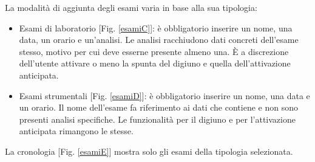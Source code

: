 \documentclass[12pt,a4paper,openright,twoside]{report}
\begin{document}
La modalità di aggiunta degli esami varia in base alla sua tipologia:
\begin{itemize}
    \item Esami di laboratorio [Fig. \ref{esamiC}]: è obbligatorio inserire un nome, una data, un orario e un'analisi. Le analisi racchiudono dati concreti dell'esame stesso, motivo per cui deve esserne presente almeno una. \`E a discrezione dell'utente attivare o meno la spunta del digiuno e quella dell'attivazione anticipata.
    \item Esami strumentali [Fig. \ref{esamiD}]: è obbligatorio inserire un nome, una data e un orario. Il nome dell'esame fa riferimento ai dati che contiene e non sono presenti analisi specifiche. Le funzionalità per il digiuno e per l'attivazione anticipata rimangono le stesse.
\end{itemize}

La cronologia [Fig. \ref{esamiE}] mostra solo gli esami della tipologia selezionata.
\end{document}
